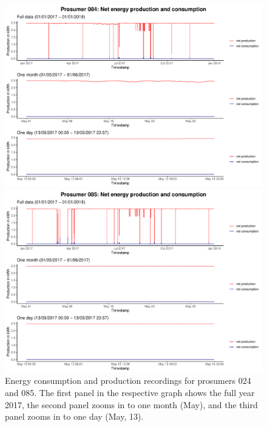 \begin{figure}
\centering
\begin{minipage}[h]{\dimexpr.5\textwidth-0.15em}
\includegraphics[width=\textwidth]{thesis/graphs/timeseries/p084_prod&cons.pdf}
\end{minipage}
\begin{minipage}[h]{\dimexpr.5\textheight-0.15em}
\includegraphics[width=\textwidth]{thesis/graphs/timeseries/p085_prod&cons.pdf}
\end{minipage}

\caption[Energy consumption and production recordings for prosumers 084 and 085]{Energy consumption and production recordings for prosumers 024 and 085. The first panel in the respective graph shows the full year 2017, the second panel zooms in to one month (May), and the third panel zooms in to one day (May, 13). \quantnet}
\label{Fig:energyconsprod_p084p085}
\end{figure}

